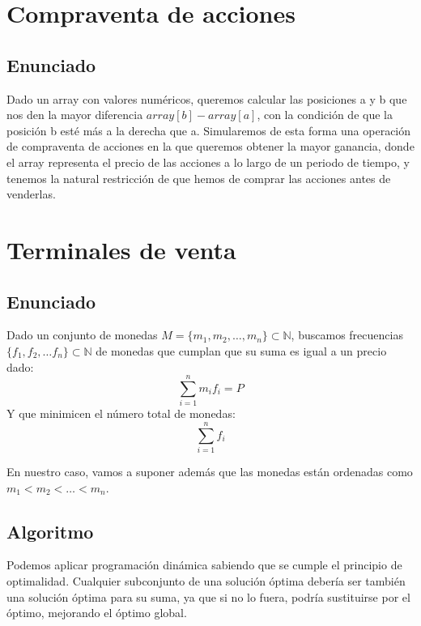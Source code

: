 \documentclass[a4paper, 11pt]{article} %
\begin{document}

\section{Compraventa de acciones}
	\subsection{Enunciado}
      Dado un array con valores numéricos, queremos calcular las posiciones a y b que nos den la mayor diferencia $array[b]-array[a]$, con la condición de que la posición b esté más a la derecha que a.
	  Simularemos de esta forma una operación de compraventa de acciones en la que queremos obtener la mayor ganancia, donde el array representa el precio de las acciones a lo largo de un periodo de tiempo, y tenemos la natural restricción de que hemos de comprar las acciones antes de venderlas. 

\section{Terminales de venta}
  \subsection{Enunciado}
    Dado un conjunto de monedas $M = \{m_1, m_2, \dots, m_n\} \subset \mathbb{N}$, buscamos frecuencias $\{f_1,f_2,\dots f_n\} \subset \mathbb{N}$ de 
    monedas que cumplan que su suma es igual a un precio dado:
    \begin{equation}
     \sum_{i=1}^n m_i f_i = P
    \end{equation}
    Y que minimicen el número total de monedas:
    \begin{equation}
     \sum_{i=1}^n f_i
    \end{equation}
    
    En nuestro caso, vamos a suponer además que las monedas están ordenadas como
    $m_1 < m_2 < \dots < m_n$. 
    
  \subsection{Algoritmo}
    Podemos aplicar programación dinámica sabiendo que se cumple el principio de optimalidad.
    Cualquier subconjunto de una solución óptima debería ser también una solución óptima para
    su suma, ya que si no lo fuera, podría sustituirse por el óptimo, mejorando el óptimo global.
    
\end{document}
